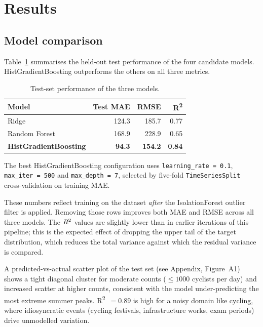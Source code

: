 \documentclass[11pt,a4paper]{article}
\begin{document}
\section{Results}
\label{sec:results}

\subsection{Model comparison}

Table~\ref{tab:results} summarises the held-out test performance of
the four candidate models. HistGradientBoosting outperforms the others
on all three metrics.

\begin{table}[ht]
\centering
\caption{Test-set performance of the three models.}
\label{tab:results}
\begin{tabular}{lrrr}
\toprule
Model & Test MAE & RMSE & R\textsuperscript{2} \\
\midrule
Ridge                         & 124.3          & 185.7          & 0.77          \\
Random Forest                 & 168.9          & 228.9          & 0.65          \\
\textbf{HistGradientBoosting} & \textbf{94.3} & \textbf{154.2} & \textbf{0.84} \\
\bottomrule
\end{tabular}
\end{table}

The best HistGradientBoosting configuration uses
\texttt{learning\_rate = 0.1}, \texttt{max\_iter = 500} and
\texttt{max\_depth = 7}, selected by five-fold
\texttt{TimeSeriesSplit} cross-validation on training MAE.

These numbers reflect training on the dataset \emph{after} the
IsolationForest outlier filter is applied. Removing those rows
improves both MAE and RMSE across all three models. The
$R\textsuperscript{2}$ values are slightly lower than in earlier
iterations of this pipeline; this is the expected effect of dropping
the upper tail of the target distribution, which reduces the total
variance against which the residual variance is compared.

A predicted-vs-actual scatter plot of the test set (see Appendix,
Figure~A1) shows a tight diagonal cluster for moderate counts
($\leq 1000$ cyclists per day) and increased scatter at higher counts,
consistent with the model under-predicting the most extreme summer
peaks. R\textsuperscript{2}~$=0.89$ is high for a noisy domain like
cycling, where idiosyncratic events (cycling festivals, infrastructure
works, exam periods) drive unmodelled variation.
\end{document}

